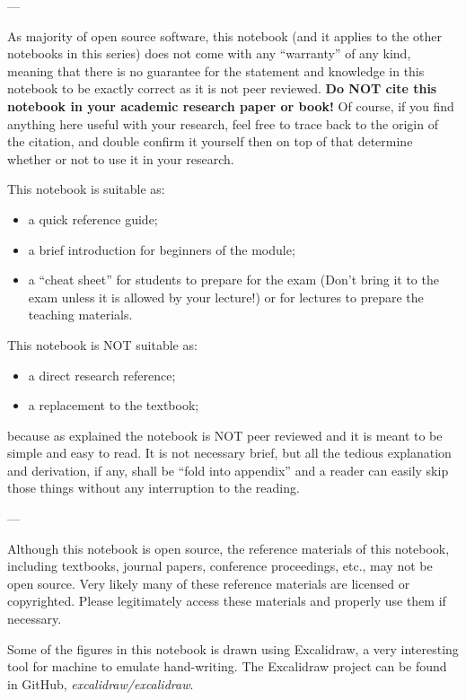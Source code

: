 \noindent ---

\noindent As majority of open source software, this notebook (and it applies to the other notebooks in this series) does not come with any ``warranty'' of any kind, meaning that there is no guarantee for the statement and knowledge in this notebook to be exactly correct as it is not peer reviewed. \textbf{Do NOT cite this notebook in your academic research paper or book!} Of course, if you find anything here useful with your research, feel free to trace back to the origin of the citation, and double confirm it yourself then on top of that determine whether or not to use it in your research.

This notebook is suitable as:
\begin{itemize}
  \item a quick reference guide;
  \item a brief introduction for beginners of the module;
  \item a ``cheat sheet'' for students to prepare for the exam (Don't bring it to the exam unless it is allowed by your lecture!) or for lectures to prepare the teaching materials.
\end{itemize}

This notebook is NOT suitable as:
\begin{itemize}
  \item a direct research reference;
  \item a replacement to the textbook;
\end{itemize}
because as explained the notebook is NOT peer reviewed and it is meant to be simple and easy to read. It is not necessary brief, but all the tedious explanation and derivation, if any, shall be ``fold into appendix'' and a reader can easily skip those things without any interruption to the reading.

\noindent ---

\noindent Although this notebook is open source, the reference materials of this notebook, including textbooks, journal papers, conference proceedings, etc., may not be open source. Very likely many of these reference materials are licensed or copyrighted. Please legitimately access these materials and properly use them if necessary. \vadjust{\vfill\pagebreak}

\noindent Some of the figures in this notebook is drawn using Excalidraw, a very interesting tool for machine to emulate hand-writing. The Excalidraw project can be found in GitHub, \textit{excalidraw/excalidraw}.
